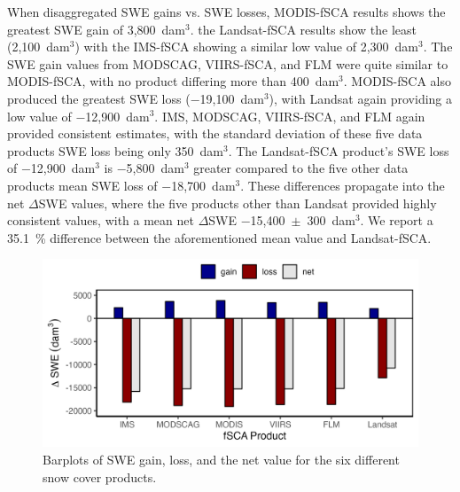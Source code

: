 \clearpage
When disaggregated SWE gains vs. SWE losses, MODIS-fSCA results shows the greatest SWE gain of 3,800~dam$^{3}$. the Landsat-fSCA results show the least (2,100~dam$^{3}$) with the IMS-fSCA showing a similar low value of 2,300~dam$^{3}$. The SWE gain values from MODSCAG, VIIRS-fSCA, and FLM were quite similar to MODIS-fSCA, with no product differing more than 400~dam$^{3}$.
MODIS-fSCA also produced the greatest SWE loss ($-$19,100~dam$^{3}$), with Landsat again providing a low value of $-$12,900~dam$^{3}$. IMS, MODSCAG, VIIRS-fSCA, and FLM again provided consistent estimates, with the standard deviation of these five data products SWE loss being only 350~dam$^{3}$. The Landsat-fSCA product's SWE loss of $-$12,900~dam$^{3}$ is $-$5,800~dam$^{3}$ greater compared to the five other data products mean SWE loss of $-$18,700~dam$^{3}$. These differences propagate into the net $\Delta$SWE values, where the five products other than Landsat provided highly consistent values, with a mean net $\Delta$SWE $-$15,400~$\pm$~300~dam$^{3}$. We report a 35.1~\% difference between the aforementioned mean value and Landsat-fSCA.


\begin{figure}[]
\centering
\includegraphics[width=\textwidth]{figures/ch4_figs/dswe_stats_dam3_v1.png}
\caption{Barplots of SWE gain, loss, and the net value for the six different snow cover products.}
\label{fig:dswe_bar_graph}
\end{figure}

